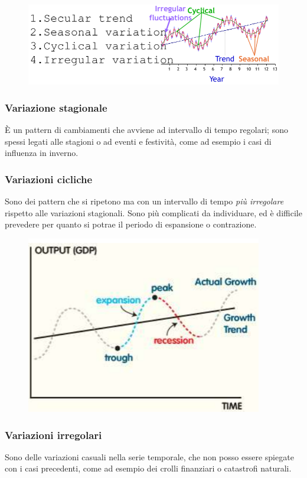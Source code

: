 \documentclass{report}
\begin{document}
\begin{figure}[H]
    \centering
    \includegraphics[width=0.7\linewidth]{images/trend.png}
\end{figure}

\subsubsection{Variazione stagionale}
È un pattern di cambiamenti che avviene ad intervallo di tempo regolari; sono spessi legati alle stagioni o ad eventi e festività, come ad esempio 
i casi di influenza in inverno.

\subsubsection{Variazioni cicliche}
Sono dei pattern che si ripetono ma con un intervallo di tempo \textit{più irregolare} rispetto alle variazioni stagionali. Sono più complicati 
da individuare, ed è difficile prevedere per quanto si potrae il periodo di espansione o contrazione.


\begin{figure}[H]
    \centering
    \includegraphics[width=0.6\linewidth]{images/variazioni-cicliche.png}
\end{figure}


\subsubsection{Variazioni irregolari}

Sono delle variazioni casuali nella serie temporale, che non posso essere spiegate con i casi precedenti, come ad esempio dei crolli finanziari 
o catastrofi naturali.
\end{document}

